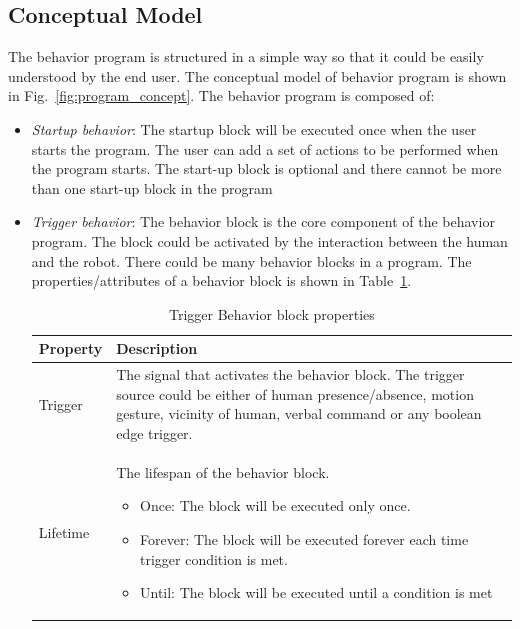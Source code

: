 \subsection{Conceptual Model}
The behavior program is structured in a simple way so that it could be easily understood by the end user. The conceptual model of behavior program is shown in Fig.~\ref{fig:program_concept}. The behavior program is composed of:
\begin{itemize}
\item \emph{Startup behavior}: The startup block will be executed once when the user starts the program. The user can add a set of actions to be performed when the program starts. The start-up block is optional and there cannot be more than one start-up block in the program
\item \emph{Trigger behavior}: The behavior block is the core component of the behavior program. The block could be activated by the interaction between the human and the robot. There could be many behavior blocks in a program. The properties/attributes of a behavior block is shown in Table~\ref{table:behavior_block}.
\begin{table}[H]
\centering
\small
\caption{Trigger Behavior block properties}
\label{table:behavior_block}
\begin{tabular}{|l|p{11cm}|}
\hline
  \textbf{Property} & \textbf{Description}
  \tabularnewline \hline
  
  Trigger & The signal that activates the behavior block. The trigger source could be either of human presence/absence, motion gesture, vicinity of human, verbal command or any boolean edge trigger.
                                          \tabularnewline\hline
                                          
  Lifetime & The lifespan of the behavior block. \begin{itemize}[leftmargin=*,topsep={0pt},itemsep={0pt},partopsep={0pt},parsep={0pt}]
                                                                      \item Once: The block will be executed only once.
                                                                      \item Forever: The block will be executed forever each time trigger condition is met.
                                                                      \item Until: The block will be executed until a condition is met
                                                                   \end{itemize}
                                          \tabularnewline\hline
  

\end{tabular}
\end{table}
\end{itemize}
